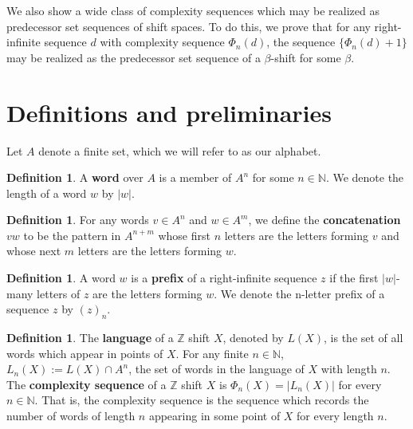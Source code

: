 \documentclass{amsart}
\theoremstyle{definition}
\newtheorem{definition}[theorem]{Definition}
\numberwithin{equation}{section}
\begin{document}
We also show a wide class of complexity sequences which may be realized as predecessor set sequences of shift spaces. To do this, we prove that for any right-infinite sequence $d$ with complexity sequence $\Phi_n(d)$, the sequence $\{\Phi_n(d)+1\}$ may be realized as the predecessor set sequence of a $\beta$-shift for some $\beta$.

\section{Definitions and preliminaries}
\label{defns}
Let $A$ denote a finite set, which we will refer to as our alphabet. 

\begin{definition}
A \textbf{word} over $A$ is a member of $A^n$ for some $n \in \mathbb{N}$. We denote the length of a word $w$ by $|w|$.
\end{definition}

\begin{definition} For any words $v \in A^n$ and $w \in A^m$, we define the \textbf{concatenation} $vw$ to be the pattern in $A^{n+m}$ whose first $n$ letters are the letters forming $v$ and whose next $m$ letters are the letters forming $w$.
\end{definition}

\begin{definition} A word $w$ is a \textbf{prefix} of a right-infinite sequence $z$ if the first $|w|$-many letters of $z$ are the letters forming $w$. We denote the n-letter prefix of a sequence $z$ by $(z)_n$.
\end{definition}

\begin{definition} 
The \textbf{language} of a $\mathbb{Z}$ shift $X$, denoted by $L(X)$, is the set of all words which appear in points of $X$. For any finite $n \in \mathbb{N}$, $L_n(X) := L(X) \cap A^n$, the set of words in the language of $X$ with length $n$. The \textbf{complexity sequence} of a $\mathbb{Z}$ shift $X$ is $\Phi_n(X) = |L_n(X)|$ for every $n \in \mathbb{N}$. That is, the complexity sequence is the sequence which records the number of words of length $n$ appearing in some point of $X$ for every length $n$.
\end{definition}
\end{document}
